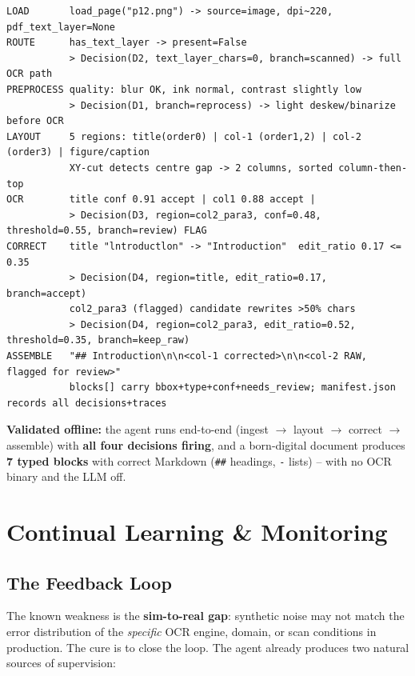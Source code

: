 \documentclass[12pt,a4paper]{article}
\begin{document}
\begin{lstlisting}[basicstyle=\ttfamily\footnotesize]
LOAD       load_page("p12.png") -> source=image, dpi~220, pdf_text_layer=None
ROUTE      has_text_layer -> present=False
           > Decision(D2, text_layer_chars=0, branch=scanned) -> full OCR path
PREPROCESS quality: blur OK, ink normal, contrast slightly low
           > Decision(D1, branch=reprocess) -> light deskew/binarize before OCR
LAYOUT     5 regions: title(order0) | col-1 (order1,2) | col-2 (order3) | figure/caption
           XY-cut detects centre gap -> 2 columns, sorted column-then-top
OCR        title conf 0.91 accept | col1 0.88 accept |
           > Decision(D3, region=col2_para3, conf=0.48, threshold=0.55, branch=review) FLAG
CORRECT    title "lntroductlon" -> "Introduction"  edit_ratio 0.17 <= 0.35
           > Decision(D4, region=title, edit_ratio=0.17, branch=accept)
           col2_para3 (flagged) candidate rewrites >50% chars
           > Decision(D4, region=col2_para3, edit_ratio=0.52, threshold=0.35, branch=keep_raw)
ASSEMBLE   "## Introduction\n\n<col-1 corrected>\n\n<col-2 RAW, flagged for review>"
           blocks[] carry bbox+type+conf+needs_review; manifest.json records all decisions+traces
\end{lstlisting}

\noindent\textbf{Validated offline:} the agent runs end-to-end (ingest $\rightarrow$ layout $\rightarrow$ correct $\rightarrow$ assemble) with \textbf{all four decisions firing}, and a born-digital document produces \textbf{7 typed blocks} with correct Markdown (\texttt{\#\#} headings, \texttt{-} lists) -- with no OCR binary and the LLM off.

\section{Continual Learning \& Monitoring}

\subsection{The Feedback Loop}

The known weakness is the \textbf{sim-to-real gap}: synthetic noise may not match the error distribution of the \emph{specific} OCR engine, domain, or scan conditions in production. The cure is to close the loop. The agent already produces two natural sources of supervision:
\end{document}
